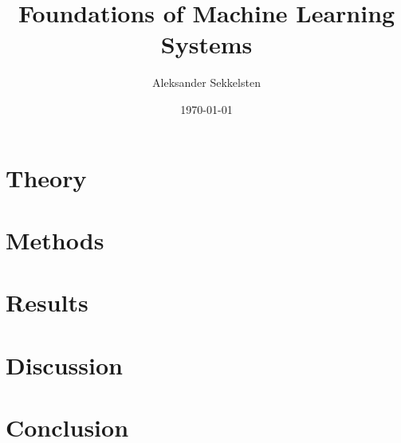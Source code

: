 \documentclass{report}
\title{Foundations of Machine Learning Systems}
\author{Aleksander Sekkelsten}
\date{\today}
\begin{document}
\maketitle
\tableofcontents
\part{Theory}

\part{Methods}


\part{Results}


\part{Discussion}


\part{Conclusion}


\printbibliography
\end{document}
